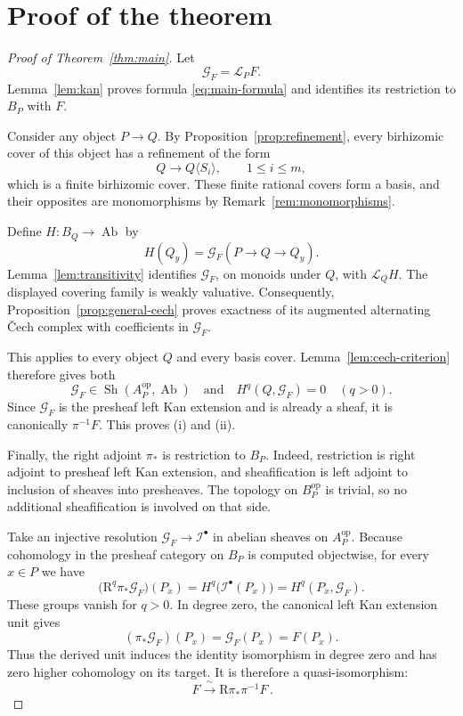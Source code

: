 \documentclass[11pt]{article}
\theoremstyle{definition}
\theoremstyle{remark}
\DeclareMathOperator{\Sh}{Sh}
\DeclareMathOperator{\Ab}{Ab}
\newcommand{\LL}{\mathcal L}
\newcommand{\cG}{\mathcal G}
\begin{document}
\section{Proof of the theorem}

\begin{proof}[Proof of Theorem~\ref{thm:main}]
Let
\[
\cG_F=\LL_PF.
\]
Lemma~\ref{lem:kan} proves formula \eqref{eq:main-formula} and
identifies its restriction to \(B_P\) with \(F\).

Consider any object \(P\to Q\). By
Proposition~\ref{prop:refinement}, every birhizomic cover of this
object has a refinement of the form
\[
Q\longrightarrow Q\langle S_i\rangle,\qquad 1\le i\le m,
\]
which is a finite birhizomic cover. These finite rational covers
form a basis, and their opposites are monomorphisms by
Remark~\ref{rem:monomorphisms}.

Define \(H:B_Q\to\Ab\) by
\[
H(Q_y)=\cG_F(P\to Q\to Q_y).
\]
Lemma~\ref{lem:transitivity} identifies \(\cG_F\), on monoids under
\(Q\), with \(\LL_QH\).
The displayed covering family is weakly valuative. Consequently,
Proposition~\ref{prop:general-cech} proves exactness of its
augmented alternating \v{C}ech complex with coefficients in
\(\cG_F\).

This applies to every object \(Q\) and every basis cover.
Lemma~\ref{lem:cech-criterion} therefore gives both
\[
\cG_F\in\Sh(A_P^{\mathrm{op}},\Ab)
\quad\text{and}\quad
H^q(Q,\cG_F)=0\quad(q>0).
\]
Since \(\cG_F\) is the presheaf left Kan extension and is already
a sheaf, it is canonically \(\pi^{-1}F\). This proves (i) and (ii).

Finally, the right adjoint \(\pi_*\) is restriction to \(B_P\).
Indeed, restriction is right adjoint to presheaf left Kan
extension, and sheafification is left adjoint to inclusion of
sheaves into presheaves. The topology on \(B_P^{\mathrm{op}}\)
is trivial, so no additional sheafification is involved on that
side.

Take an injective resolution \(\cG_F\to\mathcal I^\bullet\) in
abelian sheaves on \(A_P^{\mathrm{op}}\).
Because cohomology in the presheaf category on \(B_P\) is
computed objectwise, for every \(x\in P\) we have
\[
\bigl(\mathrm R^q\pi_*\cG_F\bigr)(P_x)
=
H^q\bigl(\mathcal I^\bullet(P_x)\bigr)
=
H^q(P_x,\cG_F).
\]
These groups vanish for \(q>0\). In degree zero, the canonical
left Kan extension unit gives
\[
(\pi_*\cG_F)(P_x)=\cG_F(P_x)=F(P_x).
\]
Thus the derived unit induces the identity isomorphism in degree
zero and has zero higher cohomology on its target. It is
therefore a quasi-isomorphism:
\[
\boxed{\,F\xrightarrow{\ \sim\ }\mathrm R\pi_*\pi^{-1}F\,}.
\]
\end{proof}
\end{document}
